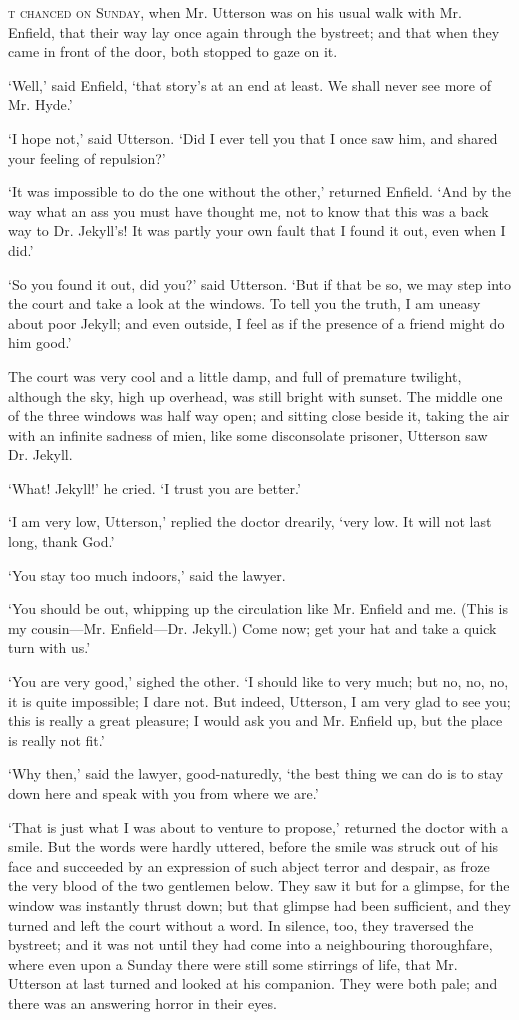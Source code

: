 \documentclass[]{novel}
\begin{document}
\textsc{t chanced on Sunday,} when Mr. Utterson was on his usual walk with Mr. Enfield, that their way lay once again through the bystreet; and that when they came in front of the door, both stopped to gaze on it.

‘Well,’ said Enfield, ‘that story’s at an end at least. We shall never see more of Mr. Hyde.’

‘I hope not,’ said Utterson. ‘Did I ever tell you that I once saw him, and shared your feeling of repulsion?’

‘It was impossible to do the one without the other,’ returned Enfield. ‘And by the way what an ass you must have thought me, not to know that this was a back way to Dr. Jekyll’s! It was partly your own fault that I found it out, even when I did.’

‘So you found it out, did you?’ said Utterson. ‘But if that be so, we may step into the court and take a look at the windows. To tell you the truth, I am uneasy about poor Jekyll; and even outside, I feel as if the presence of a friend might do him good.’

The court was very cool and a little damp, and full of premature twilight, although the sky, high up overhead, was still bright with sunset. The middle one of the three windows was half way open; and sitting close beside it, taking the air with an infinite sadness of mien, like some disconsolate prisoner, Utterson saw Dr. Jekyll.

‘What! Jekyll!’ he cried. ‘I trust you are better.’

‘I am very low, Utterson,’ replied the doctor drearily, ‘very low. It will not last long, thank God.’

‘You stay too much indoors,’ said the lawyer.

‘You should be out, whipping up the circulation like Mr. Enfield and me. (This is my cousin—Mr. Enfield—Dr. Jekyll.) Come now; get your hat and take a quick turn with us.’

‘You are very good,’ sighed the other. ‘I should like to very much; but no, no, no, it is quite impossible; I dare not. But indeed, Utterson, I am very glad to see you; this is really a great pleasure; I would ask you and Mr. Enfield up, but the place is really not fit.’

‘Why then,’ said the lawyer, good-naturedly, ‘the best thing we can do is to stay down here and speak with you from where we are.’

‘That is just what I was about to venture to propose,’ returned the doctor with a smile. But the words were hardly uttered, before the smile was struck out of his face and succeeded by an expression of such abject terror and despair, as froze the very blood of the two gentlemen below. They saw it but for a glimpse, for the window was instantly thrust down; but that glimpse had been sufficient, and they turned and left the court without a word. In silence, too, they traversed the bystreet; and it was not until they had come into a neighbouring thoroughfare, where even upon a Sunday there were still some stirrings of life, that Mr. Utterson at last turned and looked at his companion. They were both pale; and there was an answering horror in their eyes.
\end{document}
